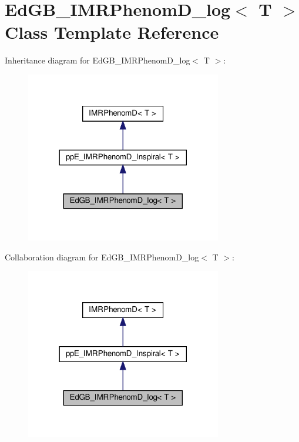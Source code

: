 \hypertarget{classEdGB__IMRPhenomD__log}{}\section{Ed\+G\+B\+\_\+\+I\+M\+R\+Phenom\+D\+\_\+log$<$ T $>$ Class Template Reference}
\label{classEdGB__IMRPhenomD__log}


Inheritance diagram for Ed\+G\+B\+\_\+\+I\+M\+R\+Phenom\+D\+\_\+log$<$ T $>$\+:\nopagebreak
\begin{figure}[H]
\begin{center}
\leavevmode
\includegraphics[width=242pt]{classEdGB__IMRPhenomD__log__inherit__graph}
\end{center}
\end{figure}


Collaboration diagram for Ed\+G\+B\+\_\+\+I\+M\+R\+Phenom\+D\+\_\+log$<$ T $>$\+:\nopagebreak
\begin{figure}[H]
\begin{center}
\leavevmode
\includegraphics[width=242pt]{classEdGB__IMRPhenomD__log__coll__graph}
\end{center}
\end{figure}
